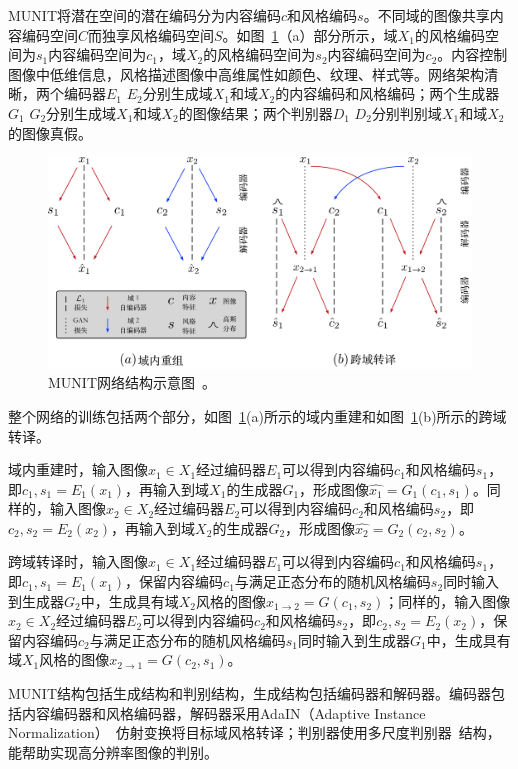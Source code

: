 MUNIT将潜在空间的潜在编码分为内容编码$c$和风格编码$s$。不同域的图像共享内容编码空间$C$而独享风格编码空间$S$。如图~\ref{fig:munit}（a）部分所示，域$X_1$的风格编码空间为$s_1$内容编码空间为$c_1$，域$X_2$的风格编码空间为$s_2$内容编码空间为$c_2$。内容控制图像中低维信息，风格描述图像中高维属性如颜色、纹理、样式等。网络架构清晰，两个编码器$E_1$ $E_2$分别生成域$X_1$和域$X_2$的内容编码和风格编码；两个生成器$G_1$ $G_2$分别生成域$X_1$和域$X_2$的图像结果；两个判别器$D_1$ $D_2$分别判别域$X_1$和域$X_2$的图像真假。

\begin{figure}[ht]
    \centering
	\includegraphics[width=\textwidth]{figures/munit.pdf}
	\caption{MUNIT网络结构示意图~\cite{huang2018multimodal}。}
	\label{fig:munit}
\end{figure}

整个网络的训练包括两个部分，如图~\ref{fig:munit}(a)所示的域内重建和如图~\ref{fig:munit}(b)所示的跨域转译。

域内重建时，输入图像$x_1 \in X_1$经过编码器$E_1$可以得到内容编码$c_1$和风格编码$s_1$，即$c_1,s_1=E_1(x_1)$，再输入到域$X_1$的生成器$G_1$，形成图像$\hat{x_1}=G_1(c_1,s_1)$。同样的，输入图像$x_2 \in X_2$经过编码器$E_2$可以得到内容编码$c_2$和风格编码$s_2$，即$c_2,s_2=E_2(x_2)$，再输入到域$X_2$的生成器$G_2$，形成图像$\hat{x_2}=G_2(c_2,s_2)$。

跨域转译时，输入图像$x_1 \in X_1$经过编码器$E_1$可以得到内容编码$c_1$和风格编码$s_1$，即$c_1,s_1=E_1(x_1)$，保留内容编码$c_1$与满足正态分布的随机风格编码$s_2$同时输入到生成器$G_2$中，生成具有域$X_2$风格的图像$x_{1 \rightarrow 2}=G(c_1,s_2)$；同样的，输入图像$x_2 \in X_2$经过编码器$E_2$可以得到内容编码$c_2$和风格编码$s_2$，即$c_2,s_2=E_2(x_2)$，保留内容编码$c_2$与满足正态分布的随机风格编码$s_1$同时输入到生成器$G_1$中，生成具有域$X_1$风格的图像$x_{2 \rightarrow 1}=G(c_2,s_1)$。

MUNIT结构包括生成结构和判别结构，生成结构包括编码器和解码器。编码器包括内容编码器和风格编码器，解码器采用AdaIN（Adaptive Instance Normalization）~\cite{huang2017arbitrary}仿射变换将目标域风格转译；判别器使用多尺度判别器~\cite{wang2018high}结构，能帮助实现高分辨率图像的判别。

